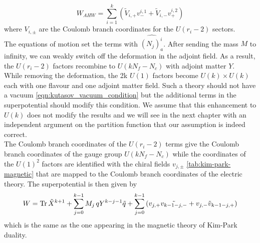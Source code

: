 \begin{equation}
W_{AHW} = \sum_{i=1}^k \left( \tilde{V}_{i,+} {v}^{i,1}_- + \tilde{V}_{i,-} {v}^{i,2}_+   \right)
\end{equation}
where $V_{i,\pm}$ are the Coulomb branch coordinates for the $U(r_i-2)$ sectors.\\
The equations of motion set the terms with $\hat{ (N_j)_a^i}$.
After sending the mass $M$ to infinity, we can weakly switch off the deformation in the adjoint field. 
As a result, the $U(r_i-2)$ factors recombine to $U(k N_f - N_c)$ with adjoint matter $Y$.\\
While removing the deformation, the 2k $U(1)$ factors become $U(k) \times U(k)$ each with one flavour and one adjoint matter field. 
Such a theory should not have a vacuum \eqref{eqn:kutasov_vacuum_condition} but the additional terms in the superpotential should modify this condition.
We assume that this enhancement to $U(k)$ does not modify the results and we will see in the next chapter with an independent argument on the partition function that our assumption is indeed correct.\\
The Coulomb branch coordinates of the $U(r_i-2)$ terms give the Coulomb branch coordinates of the gauge group $U(k N_f -N_c)$ while the coordinates of the $U(1)^2$ factors are identified with the chiral fields $v_{j,\pm}$ \eqref{tab:kim-park-magnetic} that are mapped to the Coulomb branch coordinates of the electric theory.
The superpotential is then given by
\begin{equation}
W = \mathrm{Tr } \,{\tilde{X}^{k+1}} + \sum_{j=0}^{k-1} M_j \, q Y^{k-j-1} \tilde{q} + \sum_{j=0}^{k-1} \left(  v_{j,+} \tilde{v_{k-1-j,-}} + v_{j,-} \tilde{v}_{k-1-j,+} \right)
\end{equation}
 which is the same as the one appearing in the magnetic theory of Kim-Park duality.














